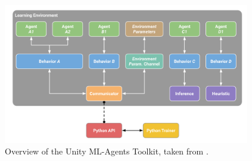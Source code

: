 \begin{figure}[!ht]
        \centering
        \includegraphics[width=0.96\textwidth]{images/unity-learning_environment_full.png}
        \caption{Overview of the Unity ML-Agents Toolkit, taken from \cite{github-unity-mlagents-toolkit}.
        }
        \label{fig:unity-learning-environment-full}
\end{figure}


